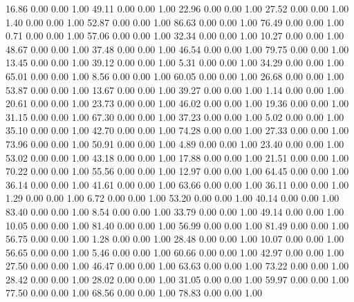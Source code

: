    16.86   0.00   0.00   1.00
   49.11   0.00   0.00   1.00
   22.96   0.00   0.00   1.00
   27.52   0.00   0.00   1.00
    1.40   0.00   0.00   1.00
   52.87   0.00   0.00   1.00
   86.63   0.00   0.00   1.00
   76.49   0.00   0.00   1.00
    0.71   0.00   0.00   1.00
   57.06   0.00   0.00   1.00
   32.34   0.00   0.00   1.00
   10.27   0.00   0.00   1.00
   48.67   0.00   0.00   1.00
   37.48   0.00   0.00   1.00
   46.54   0.00   0.00   1.00
   79.75   0.00   0.00   1.00
   13.45   0.00   0.00   1.00
   39.12   0.00   0.00   1.00
    5.31   0.00   0.00   1.00
   34.29   0.00   0.00   1.00
   65.01   0.00   0.00   1.00
    8.56   0.00   0.00   1.00
   60.05   0.00   0.00   1.00
   26.68   0.00   0.00   1.00
   53.87   0.00   0.00   1.00
   13.67   0.00   0.00   1.00
   39.27   0.00   0.00   1.00
    1.14   0.00   0.00   1.00
   20.61   0.00   0.00   1.00
   23.73   0.00   0.00   1.00
   46.02   0.00   0.00   1.00
   19.36   0.00   0.00   1.00
   31.15   0.00   0.00   1.00
   67.30   0.00   0.00   1.00
   37.23   0.00   0.00   1.00
    5.02   0.00   0.00   1.00
   35.10   0.00   0.00   1.00
   42.70   0.00   0.00   1.00
   74.28   0.00   0.00   1.00
   27.33   0.00   0.00   1.00
   73.96   0.00   0.00   1.00
   50.91   0.00   0.00   1.00
    4.89   0.00   0.00   1.00
   23.40   0.00   0.00   1.00
   53.02   0.00   0.00   1.00
   43.18   0.00   0.00   1.00
   17.88   0.00   0.00   1.00
   21.51   0.00   0.00   1.00
   70.22   0.00   0.00   1.00
   55.56   0.00   0.00   1.00
   12.97   0.00   0.00   1.00
   64.45   0.00   0.00   1.00
   36.14   0.00   0.00   1.00
   41.61   0.00   0.00   1.00
   63.66   0.00   0.00   1.00
   36.11   0.00   0.00   1.00
    1.29   0.00   0.00   1.00
    6.72   0.00   0.00   1.00
   53.20   0.00   0.00   1.00
   40.14   0.00   0.00   1.00
   83.40   0.00   0.00   1.00
    8.54   0.00   0.00   1.00
   33.79   0.00   0.00   1.00
   49.14   0.00   0.00   1.00
   10.05   0.00   0.00   1.00
   81.40   0.00   0.00   1.00
   56.99   0.00   0.00   1.00
   81.49   0.00   0.00   1.00
   56.75   0.00   0.00   1.00
    1.28   0.00   0.00   1.00
   28.48   0.00   0.00   1.00
   10.07   0.00   0.00   1.00
   56.65   0.00   0.00   1.00
    5.46   0.00   0.00   1.00
   60.66   0.00   0.00   1.00
   42.97   0.00   0.00   1.00
   27.50   0.00   0.00   1.00
   46.47   0.00   0.00   1.00
   63.63   0.00   0.00   1.00
   73.22   0.00   0.00   1.00
   28.42   0.00   0.00   1.00
   28.02   0.00   0.00   1.00
   31.05   0.00   0.00   1.00
   59.97   0.00   0.00   1.00
   77.50   0.00   0.00   1.00
   68.56   0.00   0.00   1.00
   78.83   0.00   0.00   1.00
